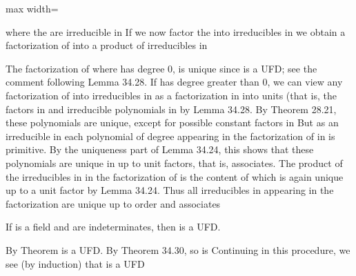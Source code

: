 \documentclass[11pt,oneside]{article}
\begin{document}
\begin{BookBody}

\begin{center}\begin{adjustbox}{max width=\linewidth}\end{adjustbox}\end{center}

\noindent where the  are irreducible in  If we now factor the  into irreducibles in  we obtain a factorization of  into a product of irreducibles in 

The factorization of  where  has degree 0, is unique since  is a UFD; see the comment following Lemma 34.28. If  has degree greater than 0, we can view any factorization of  into irreducibles in  as a factorization in  into units (that is, the factors in  and irreducible polynomials in  by Lemma 34.28. By Theorem 28.21, these polynomials are unique, except for possible constant factors in  But as an irreducible in  each polynomial of degree  appearing in the factorization of  in  is primitive. By the uniqueness part of Lemma 34.24, this shows that these polynomials are unique in  up to unit factors, that is, associates. The product of the irreducibles in  in the factorization of  is the content of  which is again unique up to a unit factor by Lemma 34.24. Thus all irreducibles in  appearing in the factorization are unique up to order and associates\BookEnd{\blacklozenge}

 If  is a field and  are indeterminates, then  is a UFD.

 By Theorem  is a UFD. By Theorem 34.30, so is  Continuing in this procedure, we see (by induction) that  is a UFD\BookEnd{\blacklozenge}


\end{BookBody}
\end{document}
